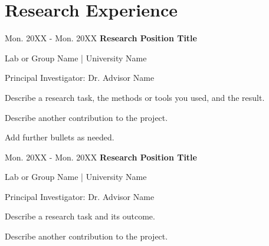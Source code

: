 \section{Research Experience}

    \begin{twocolentry}{Mon. 20XX - Mon. 20XX}
        \textbf{Research Position Title}\\
    \end{twocolentry}
    \begin{onecolentry}
        Lab or Group Name | University Name
    \end{onecolentry}
    \vspace{0.10cm}
    \begin{onecolentry}
    Principal Investigator: Dr. Advisor Name
        \begin{highlights}
            \item Describe a research task, the methods or tools you used, and the result.
            \item Describe another contribution to the project.
            \item Add further bullets as needed.
        \end{highlights}
    \end{onecolentry}

    \vspace{0.2cm}

    \begin{twocolentry}{Mon. 20XX - Mon. 20XX}
        \textbf{Research Position Title}\\
    \end{twocolentry}
    \begin{onecolentry}
        Lab or Group Name | University Name
    \end{onecolentry}
    \vspace{0.10cm}
    \begin{onecolentry}
    Principal Investigator: Dr. Advisor Name
        \begin{highlights}
            \item Describe a research task and its outcome.
            \item Describe another contribution to the project.
        \end{highlights}
    \end{onecolentry}

    \vspace{0.2cm}
